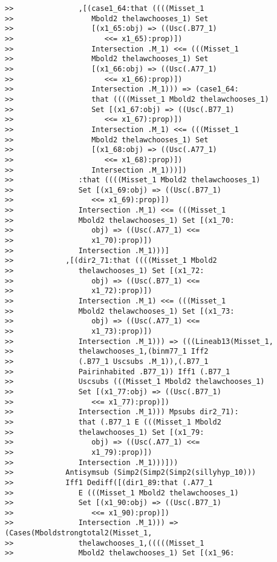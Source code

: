 \documentclass[12pt]{article}
\begin{document}
\begin{verbatim}
>>               ,[(case1_64:that ((((Misset_1
>>                  Mbold2 thelawchooses_1) Set
>>                  [(x1_65:obj) => ((Usc(.B77_1)
>>                     <<= x1_65):prop)])
>>                  Intersection .M_1) <<= (((Misset_1
>>                  Mbold2 thelawchooses_1) Set
>>                  [(x1_66:obj) => ((Usc(.A77_1)
>>                     <<= x1_66):prop)])
>>                  Intersection .M_1))) => (case1_64:
>>                  that ((((Misset_1 Mbold2 thelawchooses_1)
>>                  Set [(x1_67:obj) => ((Usc(.B77_1)
>>                     <<= x1_67):prop)])
>>                  Intersection .M_1) <<= (((Misset_1
>>                  Mbold2 thelawchooses_1) Set
>>                  [(x1_68:obj) => ((Usc(.A77_1)
>>                     <<= x1_68):prop)])
>>                  Intersection .M_1)))])
>>               :that ((((Misset_1 Mbold2 thelawchooses_1)
>>               Set [(x1_69:obj) => ((Usc(.B77_1)
>>                  <<= x1_69):prop)])
>>               Intersection .M_1) <<= (((Misset_1
>>               Mbold2 thelawchooses_1) Set [(x1_70:
>>                  obj) => ((Usc(.A77_1) <<=
>>                  x1_70):prop)])
>>               Intersection .M_1)))]
>>            ,[(dir2_71:that ((((Misset_1 Mbold2
>>               thelawchooses_1) Set [(x1_72:
>>                  obj) => ((Usc(.B77_1) <<=
>>                  x1_72):prop)])
>>               Intersection .M_1) <<= (((Misset_1
>>               Mbold2 thelawchooses_1) Set [(x1_73:
>>                  obj) => ((Usc(.A77_1) <<=
>>                  x1_73):prop)])
>>               Intersection .M_1))) => (((Lineab13(Misset_1,
>>               thelawchooses_1,(binm77_1 Iff2
>>               (.B77_1 Uscsubs .M_1)),(.B77_1
>>               Pairinhabited .B77_1)) Iff1 (.B77_1
>>               Uscsubs (((Misset_1 Mbold2 thelawchooses_1)
>>               Set [(x1_77:obj) => ((Usc(.B77_1)
>>                  <<= x1_77):prop)])
>>               Intersection .M_1))) Mpsubs dir2_71):
>>               that (.B77_1 E (((Misset_1 Mbold2
>>               thelawchooses_1) Set [(x1_79:
>>                  obj) => ((Usc(.A77_1) <<=
>>                  x1_79):prop)])
>>               Intersection .M_1)))]))
>>            Antisymsub (Simp2(Simp2(Simp2(sillyhyp_10)))
>>            Iff1 Dediff([(dir1_89:that (.A77_1
>>               E (((Misset_1 Mbold2 thelawchooses_1)
>>               Set [(x1_90:obj) => ((Usc(.B77_1)
>>                  <<= x1_90):prop)])
>>               Intersection .M_1))) => (Cases(Mboldstrongtotal2(Misset_1,
>>               thelawchooses_1,(((((Misset_1
>>               Mbold2 thelawchooses_1) Set [(x1_96:

\end{verbatim}
\end{document}

